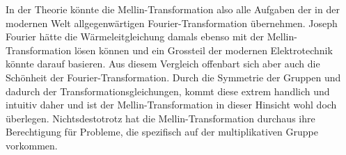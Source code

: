 In der Theorie könnte die Mellin-Transformation also alle Aufgaben der 
in der modernen Welt allgegenwärtigen Fourier-Transformation übernehmen. 
Joseph Fourier hätte die Wärmeleitgleichung damals ebenso mit der 
Mellin-Transformation lösen können und ein Grossteil der modernen 
Elektrotechnik könnte darauf basieren. 
Aus diesem Vergleich offenbart sich aber auch die Schönheit der 
Fourier-Transformation. 
Durch die Symmetrie der Gruppen und dadurch der Transformationsgleichungen,
kommt diese extrem handlich und intuitiv daher und ist der 
Mellin-Transformation in dieser Hinsicht wohl doch überlegen.
Nichtsdestotrotz hat die Mellin-Transformation durchaus ihre 
Berechtigung für Probleme, die spezifisch auf der multiplikativen 
Gruppe vorkommen.



